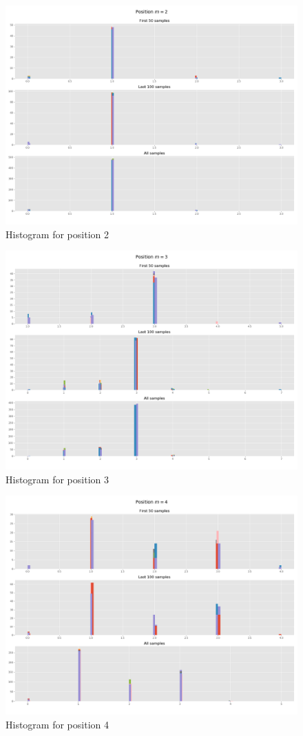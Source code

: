 \documentclass[]{article}
\begin{document}
	\begin{figure}[H]
		\begin{center}
			
			\includegraphics[width=.5\textwidth]{task4/figures/T_2_4/Q2/distribution_pos2.png}
			\caption*{Histogram for position 2}
		\end{center}
	\end{figure}
	
	\begin{figure}[H]
		\begin{center}
			
			\includegraphics[width=.5\textwidth]{task4/figures/T_2_4/Q2/distribution_pos3.png}
			\caption*{Histogram for position 3}
		\end{center}
	\end{figure}
	
	\begin{figure}[H]
		\begin{center}
			
			\includegraphics[width=.5\textwidth]{task4/figures/T_2_4/Q2/distribution_pos4.png}
			\caption*{Histogram for position 4}
		\end{center}
	\end{figure}
	
\end{document}
